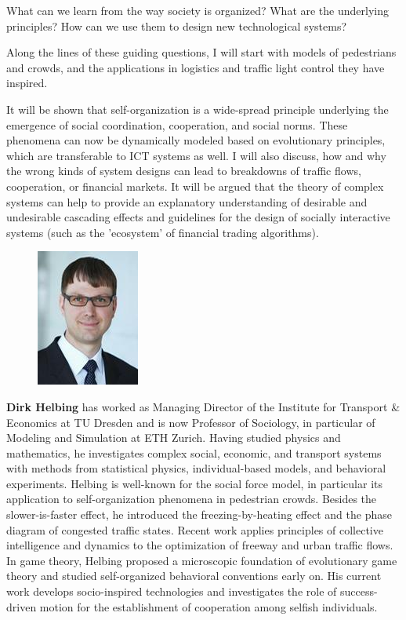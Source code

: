 \noindent  What can we learn from the way society is organized? What are the
underlying principles? How can we use them to design new technological systems?

Along the lines of these guiding questions, I will start with models of
pedestrians and crowds, and the applications in logistics and traffic light
control they have inspired.

It will be shown that self-organization is a wide-spread principle underlying
the emergence of social coordination, cooperation, and social norms. These
phenomena can now be dynamically modeled based on evolutionary principles, which
are transferable to ICT systems as well. I will also discuss, how and why the
wrong kinds of system designs can lead to breakdowns of traffic flows,
cooperation, or financial markets. It will be argued that the theory of complex
systems can help to provide an explanatory understanding of desirable and
undesirable cascading effects and guidelines for the design of socially
interactive systems (such as the 'ecosystem' of financial trading algorithms).
\\

\begin{figure}
  \includegraphics{dirk_helbing}
\end{figure}

\noindent\textbf{Dirk Helbing} has worked as Managing Director of the Institute
for Transport \& Economics at TU Dresden and is now Professor of Sociology, in
particular of Modeling and Simulation at ETH Zurich. Having studied physics and
mathematics, he investigates complex social, economic, and transport systems
with methods from statistical physics, individual-based models, and behavioral
experiments. Helbing is well-known for the social force model, in particular its
application to self-organization phenomena in pedestrian crowds. Besides the
slower-is-faster effect, he introduced the freezing-by-heating effect and the
phase diagram of congested traffic states. Recent work applies principles of
collective intelligence and dynamics to the optimization of freeway and urban
traffic flows. In game theory, Helbing proposed a microscopic foundation of
evolutionary game theory and studied self-organized behavioral conventions early
on. His current work develops socio-inspired technologies and investigates the
role of success-driven motion for the establishment of cooperation among selfish
individuals.
